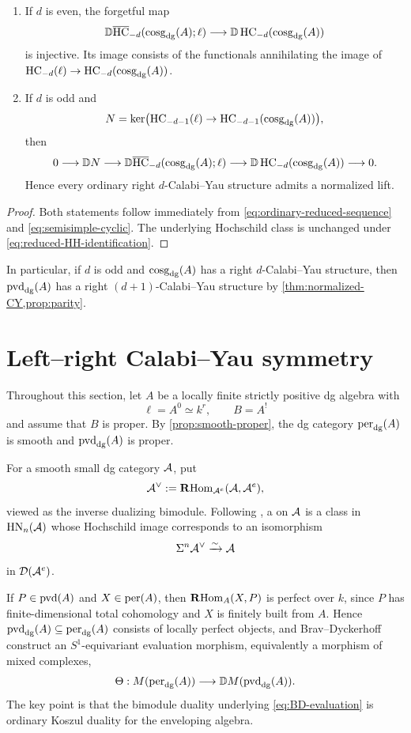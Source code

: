 \documentclass[11pt,a4paper,dvipsnames,x11names]{amsart}
\begin{document}
\begin{prop}\label{prop:parity}
\begin{enumerate}[label=\textup{(\arabic*)}]
\item If $d$ is even, the forgetful map
\[
\mathbb D\overline{\operatorname{HC}}_{-d}(\operatorname{cosg}_{\mathrm{dg}}(A);\ell)\longrightarrow\mathbb D\operatorname{HC}_{-d}(\operatorname{cosg}_{\mathrm{dg}}(A))
\]
is injective. Its image consists of the functionals annihilating the image of $\operatorname{HC}_{-d}(\ell)\to\operatorname{HC}_{-d}(\operatorname{cosg}_{\mathrm{dg}}(A))$.
\item If $d$ is odd and
\[
N=\ker\bigl(\operatorname{HC}_{-d-1}(\ell)\to\operatorname{HC}_{-d-1}(\operatorname{cosg}_{\mathrm{dg}}(A))\bigr),
\]
then
\[
0\longrightarrow \mathbb D N\longrightarrow \mathbb D\overline{\operatorname{HC}}_{-d}(\operatorname{cosg}_{\mathrm{dg}}(A);\ell)\longrightarrow\mathbb D\operatorname{HC}_{-d}(\operatorname{cosg}_{\mathrm{dg}}(A))\longrightarrow0.
\]
Hence every ordinary right $d$-Calabi--Yau structure admits a normalized lift.
\end{enumerate}
\end{prop}

\begin{proof}
Both statements follow immediately from \eqref{eq:ordinary-reduced-sequence} and \eqref{eq:semisimple-cyclic}. The underlying Hochschild class is unchanged under \eqref{eq:reduced-HH-identification}.
\end{proof}


In particular, if $d$ is odd and $\operatorname{cosg}_{\mathrm{dg}}(A)$ has a right $d$-Calabi--Yau structure, then $\operatorname{pvd}_{\mathrm{dg}}(A)$ has a right $(d+1)$-Calabi--Yau structure by \cref{thm:normalized-CY,prop:parity}.

\section{Left--right Calabi--Yau symmetry}\label{sec:left-right-CY}

Throughout this section, let $A$ be a locally finite strictly positive dg algebra with
\[
\ell=A^0\simeq k^r,\qquad B=A^!
\]
and assume that $B$ is proper. By \cref{prop:smooth-proper}, the dg category $\operatorname{per}_{\mathrm{dg}}(A)$ is smooth and $\operatorname{pvd}_{\mathrm{dg}}(A)$ is proper.

For a smooth small dg category $\mathcal A$, put
\[
\mathcal A^{\vee}:=\operatorname{\mathbf{R}Hom}_{\mathcal A^e}(\mathcal A,\mathcal A^e),
\]
viewed as the inverse dualizing bimodule. Following \cite{BravDyckerhoff19}, a  on $\mathcal A$ is a class in $\operatorname{HN}_n(\mathcal A)$ whose Hochschild image corresponds to an isomorphism
\[
\Sigma^n\mathcal A^{\vee}\xrightarrow{\sim}\mathcal A
\]
in $\mathcal D(\mathcal A^e)$.

If $P\in\operatorname{pvd}(A)$ and $X\in\operatorname{per}(A)$, then $\operatorname{\mathbf{R}Hom}_A(X,P)$ is perfect over $k$, since $P$ has finite-dimensional total cohomology and $X$ is finitely built from $A$. Hence $\operatorname{pvd}_{\mathrm{dg}}(A)\subseteq\operatorname{per}_{\mathrm{dg}}(A)$ consists of locally perfect objects, and Brav--Dyckerhoff construct an $S^1$-equivariant evaluation morphism, equivalently a morphism of mixed complexes,
\begin{equation}\label{eq:BD-evaluation}
\Theta:M(\operatorname{per}_{\mathrm{dg}}(A))\longrightarrow \mathbb D M(\operatorname{pvd}_{\mathrm{dg}}(A)).
\end{equation}
The key point is that the bimodule duality underlying \eqref{eq:BD-evaluation} is ordinary Koszul duality for the enveloping algebra.
\end{document}
